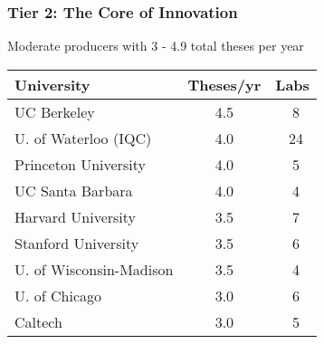 \documentclass[aspectratio=169]{beamer}
\newcommand{\tabletext}{\small}
\begin{document}
\begin{frame}
    \frametitle{Tier 2: The Core of Innovation}
    Moderate producers with 3 - 4.9 total theses per year
    
    \begin{table}
        \centering
        \tabletext
        \begin{tabularx}{\textwidth}{
            l
            S[table-format=1.1]
            S[table-format=2.0, table-space-text-pre=~]
        }
            \toprule
            \textbf{University} & {\textbf{Theses/yr}} & {\textbf{Labs}} \\
            \midrule
            UC Berkeley & 4.5 & ~8 \\
            U. of Waterloo (IQC) & 4.0 & ~24 \\
            Princeton University & 4.0 & ~5 \\
            UC Santa Barbara & 4.0 & ~4 \\
            Harvard University & 3.5 & ~7 \\
            Stanford University & 3.5 & ~6 \\
            U. of Wisconsin-Madison & 3.5 & ~4 \\
            U. of Chicago & 3.0 & ~6 \\
            Caltech & 3.0 & ~5 \\
            \bottomrule
        \end{tabularx}
    \end{table}
\end{frame}
\end{document}
